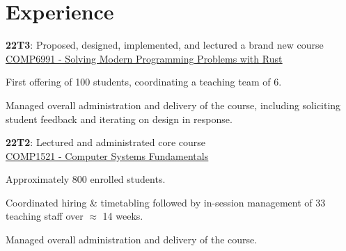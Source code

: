\documentclass[a4paper]{deedy-resume}
\begin{document}
\begin{minipage}[t]{0.66\textwidth}


\section{Experience}


\vspace{\topsep} %
\begin{tightitemize}
\item
	\textbf{22T3}: Proposed, designed, implemented, and lectured
	a brand new course \\
	\href{https://www.handbook.unsw.edu.au/undergraduate/courses/current/COMP6991}
		 {\underline{COMP6991 - Solving Modern Programming Problems with Rust}}
\item First offering of 100 students, coordinating a teaching team of 6.
\item Managed overall administration and delivery of the course,
	  including soliciting student feedback and
	  iterating on design in response.
\item
	\textbf{22T2}: Lectured and administrated core course \\
	\href{https://www.handbook.unsw.edu.au/undergraduate/courses/current/COMP1521}
		 {\underline{COMP1521 - Computer Systems Fundamentals}}
\item Approximately 800 enrolled students.
\item Coordinated hiring \& timetabling followed by
	  in-session management of 33 teaching staff over $\approx$ 14 weeks.
\item Managed overall administration and delivery of the course.
\end{tightitemize}

\sectionspace




\end{minipage}
\end{document}
